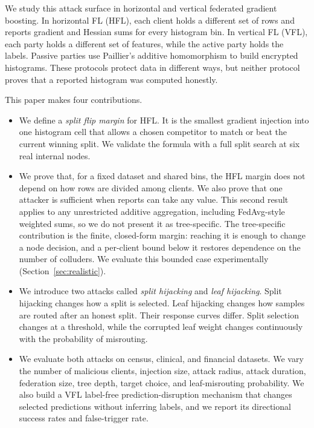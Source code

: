 \documentclass[11pt]{article}
\begin{document}
We study this attack surface in horizontal and vertical federated gradient boosting. In horizontal FL (HFL), each client holds a different set of rows and reports gradient and Hessian sums for every histogram bin. In vertical FL (VFL), each party holds a different set of features, while the active party holds the labels. Passive parties use Paillier's additive homomorphism to build encrypted histograms. These protocols protect data in different ways, but neither protocol proves that a reported histogram was computed honestly.

This paper makes four contributions.

\begin{itemize}
  \item We define a \emph{split flip margin} for HFL. It is the smallest gradient injection into one histogram cell that allows a chosen competitor to match or beat the current winning split. We validate the formula with a full split search at six real internal nodes.

  \item We prove that, for a fixed dataset and shared bins, the HFL margin does not depend on how rows are divided among clients. We also prove that one attacker is sufficient when reports can take any value. This second result applies to any unrestricted additive aggregation, including FedAvg-style weighted sums, so we do not present it as tree-specific. The tree-specific contribution is the finite, closed-form margin: reaching it is enough to change a node decision, and a per-client bound below it restores dependence on the number of colluders. We evaluate this bounded case experimentally (Section~\ref{sec:realistic}).

  \item We introduce two attacks called \emph{split hijacking} and \emph{leaf hijacking}. Split hijacking changes how a split is selected. Leaf hijacking changes how samples are routed after an honest split. Their response curves differ. Split selection changes at a threshold, while the corrupted leaf weight changes continuously with the probability of misrouting.

  \item We evaluate both attacks on census, clinical, and financial datasets. We vary the number of malicious clients, injection size, attack radius, attack duration, federation size, tree depth, target choice, and leaf-misrouting probability. We also build a VFL label-free prediction-disruption mechanism that changes selected predictions without inferring labels, and we report its directional success rates and false-trigger rate.
\end{itemize}
\end{document}
